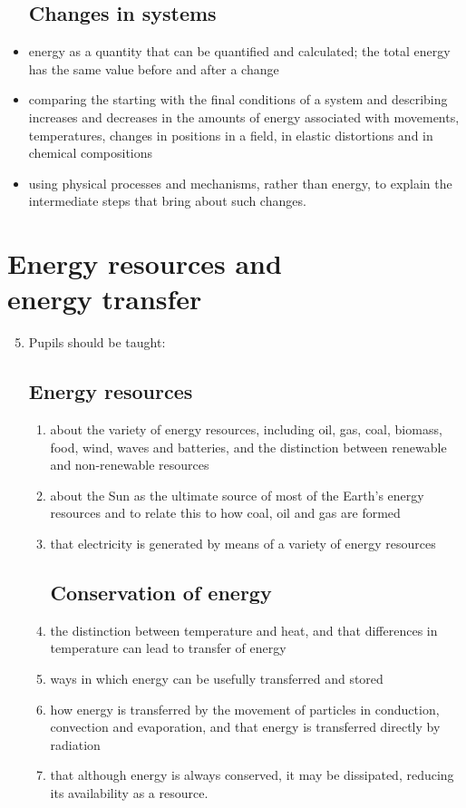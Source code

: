 \documentclass[10pt]{article}
\begin{document}
\begin{paracol}{2}
\begin{itemize}
\subsection{Changes in systems}
\item energy as a quantity that can be quantified and calculated; the total energy has the
same value before and after a change
\item comparing the starting with the final conditions of a system and describing increases
and decreases in the amounts of energy associated with movements, temperatures,
changes in positions in a field, in elastic distortions and in chemical compositions
\item using physical processes and mechanisms, rather than energy, to explain the
intermediate steps that bring about such changes.
\end{itemize}

\switchcolumn

{}
\section{Energy resources and\\energy transfer}
\begin{enumerate}
\setcounter{enumi}{4}
\item Pupils should be taught:
\subsection{Energy resources}
\begin{enumerate}
\item about the variety of energy resources, including oil, gas, coal, biomass,
food, wind, waves and batteries, and the distinction between renewable 
and non-renewable resources
\item about the Sun as the ultimate source of most of the Earth's energy resources
and to relate this to how coal, oil and gas are formed
\item that electricity is generated by means of a variety of energy resources
\subsection{Conservation of energy}
\item the distinction between temperature and heat, and that differences 
in temperature can lead to transfer of energy
\item ways in which energy can be usefully transferred and stored
\item how energy is transferred by the movement of particles in conduction,
convection and evaporation, and that energy is transferred directly 
by radiation
\item that although energy is always conserved, it may be dissipated, reducing 
its availability as a resource.
\end{enumerate}
\end{enumerate}


\end{paracol}
\end{document}
